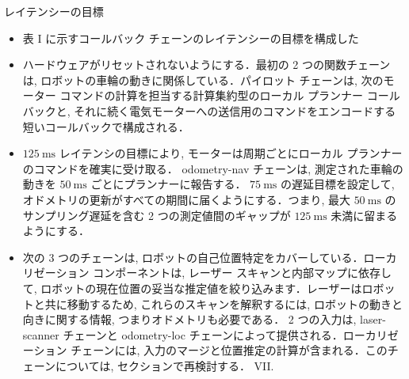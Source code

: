 \begin{frame}{レイテンシーの目標}
    \begin{itemize}
        \item 表 I に示すコールバック チェーンのレイテンシーの目標を構成した
    \end{itemize}
\end{frame}

\begin{frame}{}
    \begin{itemize}
        \item ハードウェアがリセットされないようにする．最初の 2 つの関数チェーンは, ロボットの車輪の動きに関係している．パイロット チェーンは, 次のモーター コマンドの計算を担当する計算集約型のローカル プランナー コールバックと, それに続く電気モーターへの送信用のコマンドをエンコードする短いコールバックで構成される．
    \end{itemize}
\end{frame}

\begin{frame}{}
    \begin{itemize}
        \item $125 \mathrm{~ms}$ レイテンシの目標により, モーターは周期ごとにローカル プランナーのコマンドを確実に受け取る． odometry-nav チェーンは, 測定された車輪の動きを $50 \mathrm{~ms}$ ごとにプランナーに報告する． $75 \mathrm{~ms}$ の遅延目標を設定して, オドメトリの更新がすべての期間に届くようにする．つまり, 最大 $50 \mathrm{~ms}$ のサンプリング遅延を含む 2 つの測定値間のギャップが $125 \mathrm{~ms}$ 未満に留まるようにする．
    \end{itemize}
\end{frame}

\begin{frame}{}
    \begin{itemize}
        \item 次の 3 つのチェーンは, ロボットの自己位置特定をカバーしている．ローカリゼーション コンポーネントは, レーザー スキャンと内部マップに依存して, ロボットの現在位置の妥当な推定値を絞り込みます．レーザーはロボットと共に移動するため, これらのスキャンを解釈するには, ロボットの動きと向きに関する情報, つまりオドメトリも必要である． 2 つの入力は, laser-scanner チェーンと odometry-loc チェーンによって提供される．ローカリゼーション チェーンには, 入力のマージと位置推定の計算が含まれる．このチェーンについては, セクションで再検討する． VII.
    \end{itemize}
\end{frame}

